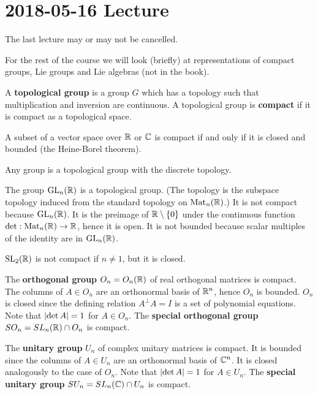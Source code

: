 \section{2018-05-16 Lecture}

The last lecture may or may not be cancelled.

For the rest of the course we will look (briefly) at representations of compact groups, Lie groups and Lie algebras (not in the book).

\begin{defn}
  A \textbf{topological group} is a group $G$ which has a topology such that multiplication and inversion are continuous.
  A topological group is \textbf{compact} if it is compact as a topological space.
\end{defn}

\begin{rmk}
  A subset of a vector space over $\mathbb{R}$ or $\mathbb{C}$ is compact if and only if it is closed and bounded (the Heine-Borel theorem).
\end{rmk}

\begin{exam}
  \lv
  \begin{enum}
    \io
    Any group is a topological group with the discrete topology.

    \io
    The group $\operatorname{GL}_n(\mathbb{R})$ is a topological group.
    (The topology is the subspace topology induced from the standard topology on $\operatorname{Mat}_n(\mathbb{R})$.)
    It is not compact because $\operatorname{GL}_n(\mathbb{R})$.
    It is the preimage of $\mathbb{R}\setminus\{0\}$ under the continuous function $\det: \operatorname{Mat}_n(\mathbb{R}) \to \mathbb{R}$, hence it is open.
    It is not bounded because scalar multiples of the identity are in $\operatorname{GL}_n(\mathbb{R})$.

    \io
    $\operatorname{SL}_2(\mathbb{R})$ is not compact if $n \neq 1$, but it is closed.

    \io
    The \textbf{orthogonal group} $O_n=O_n(\mathbb{R})$ of real orthogonal matrices is compact.
    The columns of $A \in O_n$ are an orthonormal basis of $\mathbb{R}^n$, hence $O_n$ is bounded.
    $O_n$ is closed since the defining relation $A^\perp A=I$ is a set of polynomial equations.
    Note that $\left\lvert \det A \right\rvert=1$ for $A \in O_n$.
    The \textbf{special orthogonal group} $SO_n=SL_n(\mathbb{R}) \cap O_n$ is compact.

    \io
    The \textbf{unitary group} $U_n$ of complex unitary matrices is compact.
    It is bounded since the columns of $A \in U_n$ are an orthonormal basis of $\mathbb{C}^n$.
    It is closed analogously to the case of $O_n$.
    Note that $\left\lvert \det A \right\rvert=1$ for $A \in U_n$.
    The \textbf{special unitary group} $SU_n = SL_n(\mathbb{C}) \cap U_n$ is compact.
  \end{enum}
\end{exam}

